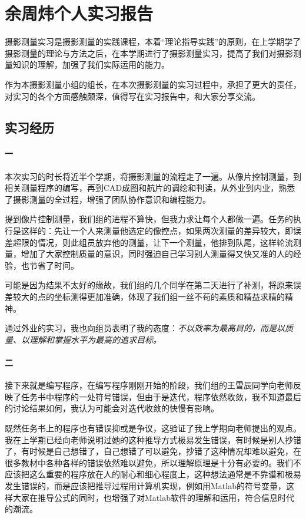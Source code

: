 \chapter{余周炜个人实习报告}

摄影测量实习是摄影测量的实践课程，本着“理论指导实践”的原则，在上学期学了摄影测量的理论与方法之后，在本学期进行了摄影测量实习，提高了我们对摄影测量知识的理解，加强了我们实际运用的能力。

作为本摄影测量小组的组长，在本次摄影测量的实习过程中，承担了更大的责任，对实习的各个方面感触颇深，值得写在实习报告中，和大家分享交流。

\section{实习经历}

\subsubsection{一}
本次实习的时长将近半个学期，将摄影测量的流程走了一遍。从像片控制测量，到相关测量程序的编写，再到CAD成图和航片的调绘和判读，从外业到内业，熟悉了摄影测量的全过程，增强了团队协作意识和编程能力。

提到像片控制测量，我们组的进程不算快，但我力求让每个人都做一遍。任务的执行是这样的：先让一个人来测量他选定的像控点，如果两次测量的差异较大，即误差超限的情况，则此组员放弃他的测量，让下一个测量，他排到队尾，这样轮流测量，增加了大家控制质量的意识，同时强迫自己学习别人测量得又快又准的人的经验，也节省了时间。

可能是因为结果不太好的缘故，我们组的几个同学在第二天进行了补测，将原来误差较大的点的坐标测得更加准确，体现了我们组一丝不苟的素质和精益求精的精神。

通过外业的实习，我也向组员表明了我的态度：\emph{不以效率为最高目的，而是以质量、以理解和掌握水平为最高的追求目标。}


\subsubsection{二}
接下来就是编写程序，在编写程序刚刚开始的阶段，我们组的王雪辰同学向老师反映了任务书中程序的一处符号错误，但由于是迭代，程序依然收敛，我不知道最后的讨论结果如何，我认为可能会对迭代收敛的快慢有影响。


既然任务书上的程序也有错误抑或是争议，这验证了我上学期向老师提出的观点。
我在上学期已经向老师说明过她的这种推导方式极易发生错误，有时候是别人抄错了，有时候是自己想错了，自己想错了可以避免，抄错了这种情况却难以避免，在很多教材中各种各样的错误依然难以避免，所以理解原理是十分有必要的。我们不应该把这么重要的程序放在人的耐心和细心程度上，这种想法通常是不靠谱和极易发生错误的，而是应该把推导过程用计算机实现，例如用Matlab的符号变量，这样大家在推导公式的同时，也增强了对Matlab软件的理解和运用，符合信息时代的潮流。

